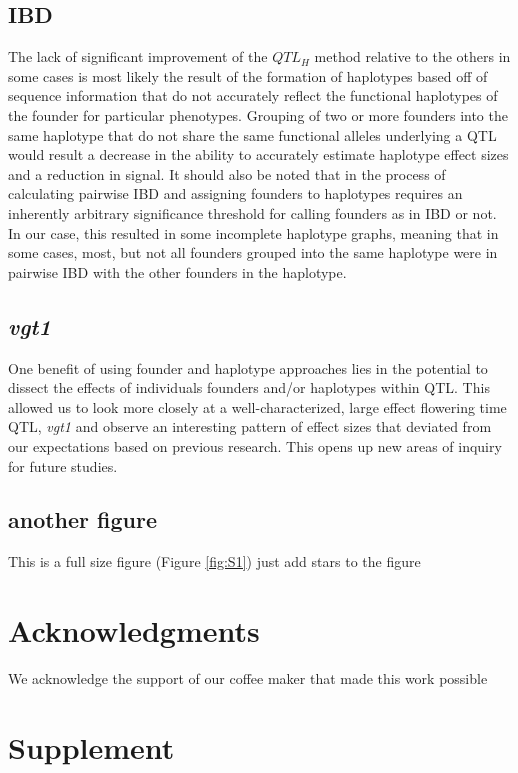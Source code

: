 \documentclass[article,9pt,twocolumn,twoside]{rilabRxiv}
\begin{document}
\subsection{IBD}
The lack of significant improvement of the $QTL_H$ method relative to the others in some cases is most likely the result of the formation of haplotypes based off of sequence information that do not accurately reflect the functional haplotypes of the founder for particular phenotypes.
Grouping of two or more founders into the same haplotype that do not share the same functional alleles underlying a QTL would result a decrease in the ability to accurately estimate haplotype effect sizes and a reduction in signal.
It should also be noted that in the process of calculating pairwise IBD and assigning founders to haplotypes requires an inherently arbitrary significance threshold for calling founders as in IBD or not.
In our case, this resulted in some incomplete haplotype graphs, meaning that in some cases, most, but not all founders grouped into the same haplotype were in pairwise IBD with the other founders in the haplotype.

\subsection{\emph{vgt1}}
One benefit of using founder and haplotype approaches lies in the potential to dissect the effects of individuals founders and/or haplotypes within QTL.
This allowed us to look more closely at a well-characterized, large effect flowering time QTL, \emph{vgt1} and observe an interesting pattern of effect sizes that deviated from our expectations based on previous research.
This opens up new areas of inquiry for future studies.


\subsection{another figure}
This is a full size figure (Figure \ref{fig:S1}) just add stars to the figure


\section{Acknowledgments}
We acknowledge the support of our coffee maker that made this work possible



\onecolumn
\section*{Supplement}
\end{document}
